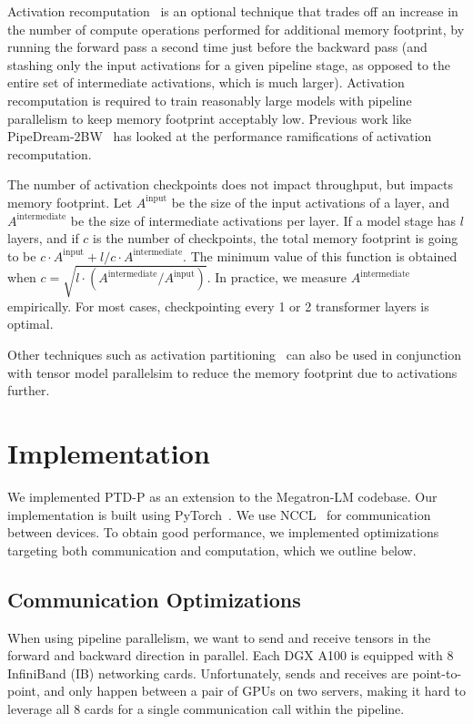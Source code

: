Activation recomputation~\cite{huang2019gpipe, chen2016training, griewank2000algorithm, mlsys2020_196} is an optional technique that trades off an increase in the number of compute operations performed for additional memory footprint, by running the forward pass a second time just before the backward pass (and stashing only the input activations for a given pipeline stage, as opposed to the entire set of intermediate activations, which is much larger). Activation recomputation is required to train reasonably large models with pipeline parallelism to keep memory footprint acceptably low. Previous work like PipeDream-2BW~\cite{narayanan2021memory} has looked at the performance ramifications of activation recomputation. 

The number of activation checkpoints does not impact throughput, but impacts memory footprint. Let $A^\text{input}$ be the size of the input activations of a layer, and $A^\text{intermediate}$ be the size of intermediate activations per layer. If a model stage has $l$ layers, and if $c$ is the number of checkpoints, the total memory footprint is going to be $c \cdot A^\text{input} + l/c \cdot A^\text{intermediate}$. The minimum value of this function is obtained when $c = \sqrt{l \cdot \left(A^\text{intermediate} / A^\text{input}\right)}$. In practice, we measure $A^\text{intermediate}$ empirically. For most cases, checkpointing every 1 or 2 transformer layers is optimal.

Other techniques such as activation partitioning~\cite{rajbhandari2019zero} can also be used in conjunction with tensor model parallelsim to reduce the memory footprint due to activations further.

\section{Implementation}

We implemented PTD-P as an extension to the Megatron-LM codebase. Our implementation is built using PyTorch~\cite{pytorch}. We use NCCL~\cite{nccl} for communication between devices. To obtain good performance, we implemented optimizations targeting both communication and computation, which we outline below.

\subsection{Communication Optimizations}

When using pipeline parallelism, we want to send and receive tensors in the forward and backward direction in parallel. Each DGX A100 is equipped with 8 InfiniBand (IB) networking cards. Unfortunately, sends and receives are point-to-point, and only happen between a pair of GPUs on two servers, making it hard to leverage all 8 cards for a single communication call within the pipeline.

